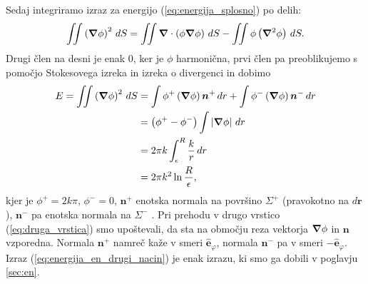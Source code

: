 \documentclass[11pt]{article}
\begin{document}
\vspace{1cm}
\noindent Sedaj integriramo izraz za energijo (\ref{eq:energija_splosno}) po delih:
\begin{equation*}
    \iint \left(\grad\phi\right)^{2}\,dS = \iint \grad \cdot \left(\phi \grad\phi\right)\,dS - \iint \phi \left(\grad^{2}\phi\right) \, dS.
\end{equation*}
Drugi člen na desni je enak $0$, ker je $\phi$ harmonična, prvi člen pa preoblikujemo s pomočjo Stokesovega izreka in izreka o divergenci in dobimo
\begin{align}
    E = \iint \left(\grad\phi\right)^{2}\,dS &=\int \phi^{+}\left(\grad\phi\right)\bm{n}^{+} \, dr + \int \phi^{-}\left(\grad\phi\right)\bm{n}^{-} \, dr \nonumber\\
    &=\left(\phi^{+} - \phi^{-}\right) \int \left|\grad\phi\right| \, dr \label{eq:druga_vrstica} \\
    &=2\pi k \int_{\epsilon}^{R} \frac{k}{r} \, dr \nonumber \\
    &=2\pi k^{2} \ln{\frac{R}{\epsilon}}, \label{eq:energija_en_drugi_nacin}
\end{align}
kjer je $\phi^{+} = 2k\pi$, $\phi^{-} = 0$, $\bm{n}^{+}$ enotska normala na površino $\Sigma^{+}$ (pravokotno na $d\bm{r}$), $\bm{n}^{-}$ pa enotska normala na $\Sigma^{-}$ . Pri prehodu v drugo vrstico (\ref{eq:druga_vrstica}) smo upoštevali, da sta na območju reza vektorja $\grad \phi$ in $\bm{n}$ vzporedna. Normala $\bm{n}^{+}$ namreč kaže v smeri $\bm{\hat{e}}_{\varphi}$, normala $\bm{n}^{-}$ pa v smeri $-\bm{\hat{e}}_{\varphi}$. Izraz (\ref{eq:energija_en_drugi_nacin}) je enak izrazu, ki smo ga dobili v poglavju \ref{sec:en}.
\end{document}
